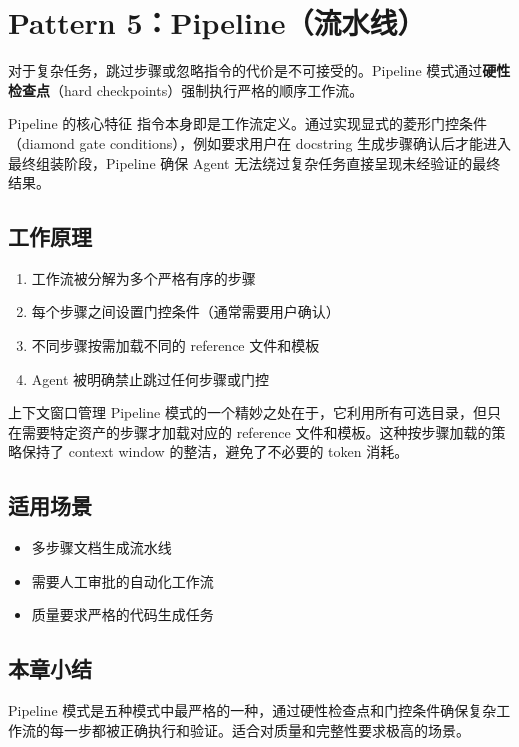\section{Pattern 5：Pipeline（流水线）}

对于复杂任务，跳过步骤或忽略指令的代价是不可接受的。Pipeline 模式通过\textbf{硬性检查点}（hard checkpoints）强制执行严格的顺序工作流。

\begin{importantbox}{Pipeline 的核心特征}
指令本身即是工作流定义。通过实现显式的菱形门控条件（diamond gate conditions），例如要求用户在 docstring 生成步骤确认后才能进入最终组装阶段，Pipeline 确保 Agent 无法绕过复杂任务直接呈现未经验证的最终结果。
\end{importantbox}

\subsection{工作原理}

\begin{enumerate}
    \item 工作流被分解为多个严格有序的步骤
    \item 每个步骤之间设置门控条件（通常需要用户确认）
    \item 不同步骤按需加载不同的 reference 文件和模板
    \item Agent 被明确禁止跳过任何步骤或门控
\end{enumerate}

\begin{knowledgebox}{上下文窗口管理}
Pipeline 模式的一个精妙之处在于，它利用所有可选目录，但只在需要特定资产的步骤才加载对应的 reference 文件和模板。这种按步骤加载的策略保持了 context window 的整洁，避免了不必要的 token 消耗。
\end{knowledgebox}

\subsection{适用场景}

\begin{itemize}
    \item 多步骤文档生成流水线
    \item 需要人工审批的自动化工作流
    \item 质量要求严格的代码生成任务
\end{itemize}

\subsection{本章小结}

Pipeline 模式是五种模式中最严格的一种，通过硬性检查点和门控条件确保复杂工作流的每一步都被正确执行和验证。适合对质量和完整性要求极高的场景。

